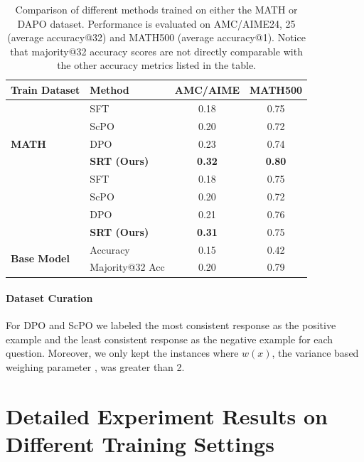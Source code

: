 \begin{table}[h!]
\centering
\renewcommand{\arraystretch}{1.2}
\begin{tabular}{@{}llcc@{}}
\toprule
\textbf{Train Dataset} & \textbf{Method} & \textbf{AMC/AIME} & \textbf{MATH500} \\
\midrule
\multirow{5}{*}{\textbf{MATH}} 
    & SFT             & 0.18 & 0.75 \\
    & ScPO            & 0.20 & 0.72 \\
    & DPO             & 0.23 & 0.74 \\
    & \textbf{SRT (Ours)} & \textbf{0.32} & \textbf{0.80} \\
\midrule
\multirow{5}{*}{\textbf{DAPO}} 
    & SFT             & 0.18 & 0.75 \\
    & ScPO            & 0.20 & 0.72 \\
    & DPO             & 0.21 & 0.76 \\
    & \textbf{SRT (Ours)} & \textbf{0.31} & 0.75 \\
\midrule
\multirow{2}{*}{\textbf{Base Model}} 
    & Accuracy     & 0.15 & 0.42 \\
    & Majority@32 Acc & 0.20 & 0.79 \\
\bottomrule
\end{tabular}
\vspace{4pt}

\caption{Comparison of different methods trained on either the MATH or DAPO dataset. Performance is evaluated on AMC/AIME24, 25 (average accuracy@32) and MATH500 (average accuracy@1). Notice that majority@32 accuracy scores are not directly comparable with the other accuracy metrics listed in the table.}
\label{tab:app_baseline_table}
\end{table}




\paragraph{Dataset Curation} For DPO and ScPO we labeled the most consistent response as the positive example and the least consistent response as the negative example for each question. Moreover, we only kept the instances where $w(x)$, the variance based weighing parameter \citep{prasad2024selfconsistencypreferenceoptimization}, was greater than 2. 

\newpage

\section{Detailed Experiment Results on Different Training Settings}
\label{app:detail_on_hp_ablations}

